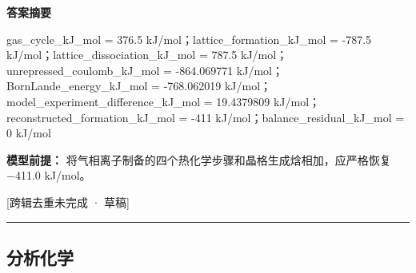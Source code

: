 \documentclass[UTF8,11pt,a4paper]{ctexart}
\begin{document}
\noindent\textbf{答案摘要}\par
gas\_cycle\_kJ\_mol = 376.5 kJ/mol；lattice\_formation\_kJ\_mol = -787.5 kJ/mol；lattice\_dissociation\_kJ\_mol = 787.5 kJ/mol；unrepressed\_coulomb\_kJ\_mol = -864.069771 kJ/mol；BornLande\_energy\_kJ\_mol = -768.062019 kJ/mol；model\_experiment\_difference\_kJ\_mol = 19.4379809 kJ/mol；reconstructed\_formation\_kJ\_mol = -411 kJ/mol；balance\_residual\_kJ\_mol = 0 kJ/mol\par
\noindent\textbf{模型前提：}
将气相离子制备的四个热化学步骤和晶格生成焓相加，应严格恢复−411.0 kJ/mol。\par
\noindent\textcolor{red!65!black}{[跨辑去重未完成 · 草稿]} \par
\medskip\hrule\medskip
\subsection*{分析化学}
\end{document}
